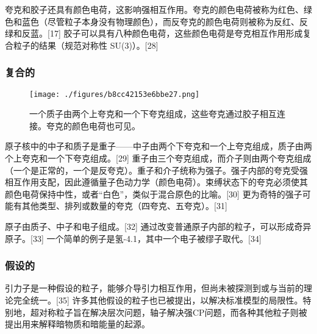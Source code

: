 夸克和胶子还具有颜色电荷，这影响强相互作用。夸克的颜色电荷被称为红色、绿色和蓝色（尽管粒子本身没有物理颜色），而反夸克的颜色电荷则被称为反红、反绿和反蓝。[17] 胶子可以具有八种颜色电荷，这些颜色电荷是夸克相互作用形成复合粒子的结果（规范对称性 SU(3)）。[28]
\subsubsection{复合的}
\begin{figure}[ht]
\centering
\texttt{[image: ./figures/b8cc42153e6bbe27.png]}
\caption{一个质子由两个上夸克和一个下夸克组成，这些夸克通过胶子相互连接。夸克的颜色电荷也可见。} \label{fig_Partic_4}
\end{figure}
原子核中的中子和质子是重子——中子由两个下夸克和一个上夸克组成，质子由两个上夸克和一个下夸克组成。[29] 重子由三个夸克组成，而介子则由两个夸克组成（一个是正常的，一个是反夸克）。重子和介子统称为强子。强子内部的夸克受强相互作用支配，因此遵循量子色动力学（颜色电荷）。束缚状态下的夸克必须使其颜色电荷保持中性，或者“白色”，类似于混合原色的比喻。[30] 更为奇特的强子可能有其他类型、排列或数量的夸克（四夸克、五夸克）。[31]

原子由质子、中子和电子组成。[32] 通过改变普通原子内部的粒子，可以形成奇异原子。[33] 一个简单的例子是氢-4.1，其中一个电子被缪子取代。[34]
\subsubsection{假设的}  
引力子是一种假设的粒子，能够介导引力相互作用，但尚未被探测到或与当前的理论完全统一。[35] 许多其他假设的粒子也已被提出，以解决标准模型的局限性。特别地，超对称粒子旨在解决层次问题，轴子解决强CP问题，而各种其他粒子则被提出用来解释暗物质和暗能量的起源。
